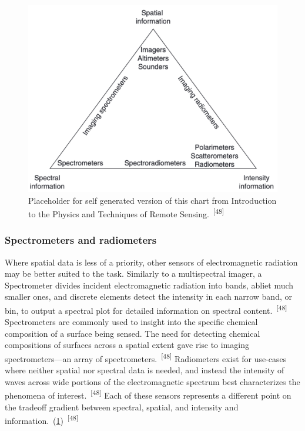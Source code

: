 \documentclass{article}
\begin{document}

\begin{figure}
    \centering
    \includegraphics[width=0.6\linewidth]{images/remote-sensor-tradeoff.png}
    \caption{Placeholder for self generated version of this chart from Introduction to the Physics and Techniques of Remote Sensing.~\textsuperscript{[48]}}
    \label{figure14}
\end{figure}

\subsubsection{Spectrometers and radiometers}


\par{Where spatial data is less of a priority, other sensors of electromagnetic radiation may be better suited to the task. Similarly to a multispectral imager, a Spectrometer divides incident electromagnetic radiation into bands, abliet much smaller ones, and discrete elements detect the intensity in each narrow band, or bin, to output a spectral plot for detailed information on spectral content.~\textsuperscript{[48]} Spectrometers are commonly used to insight into the specific chemical composition of a surface being sensed. The need for detecting chemical compositions of surfaces across a spatial extent gave rise to imaging spectrometers---an array of spectrometers.~\textsuperscript{[48]} Radiometers exist for use-cases where neither spatial nor spectral data is needed, and instead the intensity of waves across wide portions of the electromagnetic spectrum best characterizes the phenomena of interest.~\textsuperscript{[48]} Each of these sensors represents a different point on the tradeoff gradient between spectral, spatial, and intensity and information.~(\cref{figure14})~\textsuperscript{[48]}}
\end{document}
